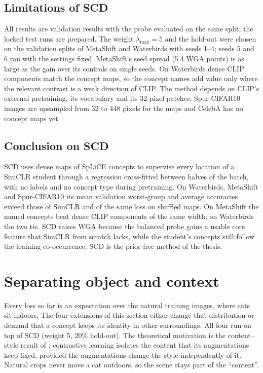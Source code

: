 \documentclass[11pt]{article}
\begin{document}
\subsection{Limitations of SCD}
All results are validation results with the probe evaluated on the same split; the locked test runs are prepared. The
weight $\lambda_{\max}=5$ and the hold-out were chosen on the validation splits of MetaShift and Waterbirds with seeds
1--4; seeds 5 and 6 ran with the settings fixed. MetaShift's seed spread (5.4 WGA points) is as large as the gain over
its controls on single seeds. On Waterbirds dense CLIP components match the concept maps, so the concept names add
value only where the relevant contrast is a weak direction of CLIP. The method depends on CLIP's external
pretraining, its vocabulary and its 32-pixel patches: Spur-CIFAR10 images are upsampled from 32 to 448 pixels for the
maps and CelebA has no concept maps yet.

\subsection{Conclusion on SCD}
SCD uses dense maps of SpLiCE concepts to supervise every location of a SimCLR student through a regression
cross-fitted between halves of the batch, with no labels and no concept type during pretraining. On Waterbirds,
MetaShift and Spur-CIFAR10 its mean validation worst-group and average accuracies exceed those of SimCLR and of the
same loss on shuffled maps. On MetaShift the named concepts beat dense CLIP components of the same width; on
Waterbirds the two tie. SCD raises WGA because the balanced probe gains a usable core feature that SimCLR from scratch
lacks, while the student's concepts still follow the training co-occurrence. SCD is the prior-free method of the
thesis.

\section{Separating object and context}
\label{sec:objectcontext}
Every loss so far is an expectation over the natural training images, where cats sit indoors. The four extensions of
this section either change that distribution or demand that a concept keeps its identity in other surroundings. All
four run on top of SCD (weight 5, 20\% hold-out). The theoretical motivation is the content--style result of
\citet{vonkugelgen2021content}: contrastive learning isolates the content that its augmentations keep fixed, provided
the augmentations change the style independently of it. Natural crops never move a cat outdoors, so the scene stays
part of the ``content''.
\end{document}
